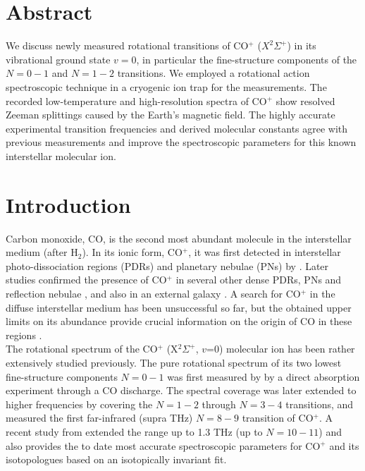 \newcommand{\co}{CO$^+$ }
\newcommand{\con}{CO$^+$}

\section*{Abstract}
We discuss newly measured rotational transitions of \co ($X ^2\Sigma ^+$) in its vibrational ground state $v=0$, in particular the fine-structure components of the $N=0-1$ and $N=1-2$ transitions. We employed a rotational action spectroscopic technique in a cryogenic ion trap for the measurements. The recorded low-temperature and high-resolution spectra of \co show resolved Zeeman splittings caused by the Earth’s magnetic field. The highly accurate experimental transition frequencies and derived molecular constants agree with previous measurements and improve the spectroscopic parameters for this known interstellar molecular ion.
\clearpage

\section{Introduction}

Carbon monoxide, CO, is the second most abundant molecule  in the interstellar medium (after H$_2$). In its ionic form, \con, it was first detected in interstellar photo-dissociation regions (PDRs) and planetary nebulae (PNs) by \citet{Latter1993}.  Later studies  confirmed the presence of \co  in several other dense PDRs, PNs and reflection nebulae \cite{Stoerzer1995, Fuente1997, Fuente2003, TFS2016, GCP2017}, and also in an external galaxy \cite{Fuente2006}. A search for \co in the diffuse interstellar medium has been unsuccessful so far, but the obtained upper limits on its abundance provide crucial information on the origin of CO in these regions \cite{GL2021}.\\

The rotational spectrum of the \co (X$^2\Sigma ^+$, $v$=0) molecular ion has been rather extensively studied previously. The pure rotational spectrum of its two lowest fine-structure components $N=0-1$ was first measured by \citet{Dixon1975} by a direct absorption experiment through a CO discharge. The spectral coverage was later extended to higher frequencies by \citet{Sastry1981} covering the $N=1-2$ through $N=3-4$ transitions, and  \citet{heuvel_dymanus_1982} measured the first far-infrared (supra THz) $N=8-9$ transition of \con. A recent study from \citet{Spezzano2013} extended the range up to 1.3 THz (up to $N=10-11$) and also provides the to date most accurate spectroscopic parameters for \co and its isotopologues based on an isotopically invariant fit. \\


